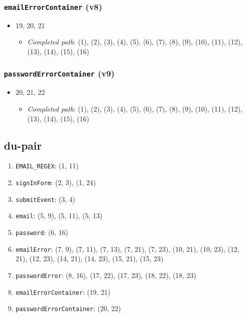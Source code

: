 \documentclass{article}
\newcommand{\completedpath}{\textit{Completed path}}
\begin{document}
\subsubsection*{\texttt{emailErrorContainer} (v8)}

\begin{itemize}
    \item 19, 20, 21
    \begin{itemize}
        \item \completedpath: (1), (2), (3), (4), (5), (6), (7), (8), (9), (10), (11), (12), (13), (14), (15), (16)
    \end{itemize}
\end{itemize}

\subsubsection*{\texttt{passwordErrorContainer} (v9)}

\begin{itemize}
    \item 20, 21, 22
    \begin{itemize}
        \item \completedpath: (1), (2), (3), (4), (5), (6), (7), (8), (9), (10), (11), (12), (13), (14), (15), (16)
    \end{itemize}
\end{itemize}

\subsection{du-pair}

\begin{enumerate}[label = (v\arabic*)]
    \item \texttt{EMAIL\_REGEX}: (1, 11)
    \item \texttt{signInForm}: (2, 3), (1, 24)
    \item \texttt{submitEvent}: (3, 4)
    \item \texttt{email}: (5, 9), (5, 11), (5, 13)
    \item \texttt{password}: (6, 16)
    \item \texttt{emailError}: (7, 9), (7, 11), (7, 13), (7, 21), (7, 23), (10, 21), (10, 23), (12, 21), (12, 23), (14, 21), (14, 23), (15, 21), (15, 23)
    \item \texttt{passwordError}: (8, 16), (17, 22), (17, 23), (18, 22), (18, 23)
    \item \texttt{emailErrorContainer}: (19, 21)
    \item \texttt{passwordErrorContainer}: (20, 22)
\end{enumerate}
\end{document}
